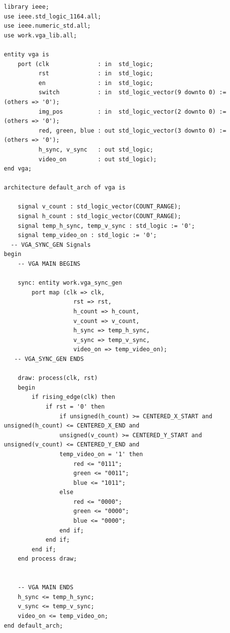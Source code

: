 \documentclass{article}
\begin{document}
\begin{lstlisting}[caption=VGA Entity for Part 2, label=lst:vga-entity-part-2]
library ieee;
use ieee.std_logic_1164.all;
use ieee.numeric_std.all;
use work.vga_lib.all;

entity vga is
    port (clk              : in  std_logic;
          rst              : in  std_logic;
          en               : in  std_logic;
		  switch           : in  std_logic_vector(9 downto 0) := (others => '0');
          img_pos          : in  std_logic_vector(2 downto 0) := (others => '0');
          red, green, blue : out std_logic_vector(3 downto 0) := (others => '0');
          h_sync, v_sync   : out std_logic;
          video_on         : out std_logic);
end vga;

architecture default_arch of vga is

    signal v_count : std_logic_vector(COUNT_RANGE);
    signal h_count : std_logic_vector(COUNT_RANGE);
	signal temp_h_sync, temp_v_sync : std_logic := '0';
	signal temp_video_on : std_logic := '0';
  -- VGA_SYNC_GEN Signals
begin 		
	-- VGA MAIN BEGINS

	sync: entity work.vga_sync_gen
		port map (clk => clk,
				    rst => rst,
				    h_count => h_count,
				    v_count => v_count,
				    h_sync => temp_h_sync,
					v_sync => temp_v_sync,
					video_on => temp_video_on);
   -- VGA_SYNC_GEN ENDS	

	draw: process(clk, rst)
	begin
		if rising_edge(clk) then
			if rst = '0' then
				if unsigned(h_count) >= CENTERED_X_START and unsigned(h_count) <= CENTERED_X_END and 
                unsigned(v_count) >= CENTERED_Y_START and unsigned(v_count) <= CENTERED_Y_END and 
                temp_video_on = '1' then
					red <= "0111";
					green <= "0011";
					blue <= "1011";
				else
					red <= "0000";
					green <= "0000";
					blue <= "0000";
				end if;
			end if;
		end if;
	end process draw;


	-- VGA MAIN ENDS
	h_sync <= temp_h_sync;
	v_sync <= temp_v_sync;
	video_on <= temp_video_on;
end default_arch;
\end{lstlisting}
\end{document}
